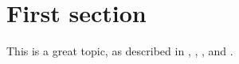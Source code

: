 \section{First section}
This is a great topic, as described in \cite{KreuzerRobbianoBook1}, \cite{KreuzerRobbianoBook2}, \cite{satattack}, and \cite{apcocoa}.